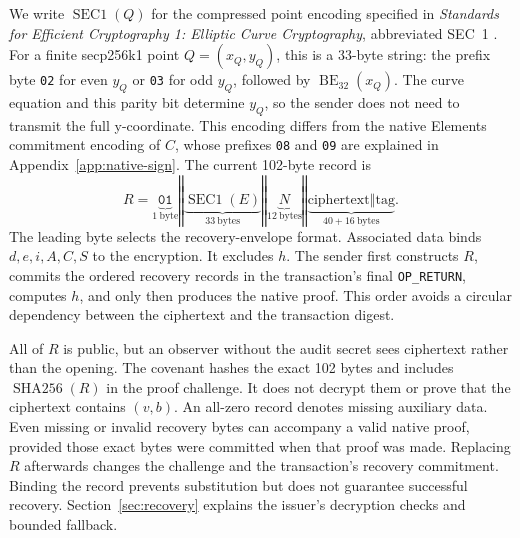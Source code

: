 \documentclass[11pt]{article}
\newcommand{\sha}{\operatorname{SHA256}}
\begin{document}
    We write $\operatorname{SEC1}(Q)$ for the compressed point encoding specified in \emph{Standards for Efficient Cryptography 1: Elliptic Curve Cryptography}, abbreviated SEC~1 \cite[Section~2.3.3]{sec1}.
    For a finite secp256k1 point $Q=(x_Q,y_Q)$, this is a 33-byte string: the prefix byte \texttt{02} for even $y_Q$ or \texttt{03} for odd $y_Q$, followed by $\operatorname{BE}_{32}(x_Q)$.
    The curve equation and this parity bit determine $y_Q$, so the sender does not need to transmit the full y-coordinate.
    This encoding differs from the native Elements commitment encoding of $C$, whose prefixes \texttt{08} and \texttt{09} are explained in Appendix~\ref{app:native-sign}.
    The current 102-byte record is
    \[
        R=\underbrace{\mathtt{01}}_{1\ \mathrm{byte}}
        \mathbin\Vert\underbrace{\operatorname{SEC1}(E)}_{33\ \mathrm{bytes}}
        \mathbin\Vert\underbrace{N}_{12\ \mathrm{bytes}}
        \mathbin\Vert\underbrace{\mathrm{ciphertext}\mathbin\Vert\mathrm{tag}}_{40+16\ \mathrm{bytes}}.
    \]
    The leading byte selects the recovery-envelope format.
    Associated data binds $d,e,i,A,C,S$ to the encryption.
    It excludes $h$.
    The sender first constructs $R$, commits the ordered recovery records in the transaction's final \texttt{OP\_RETURN}, computes $h$, and only then produces the native proof.
    This order avoids a circular dependency between the ciphertext and the transaction digest.

    All of $R$ is public, but an observer without the audit secret sees ciphertext rather than the opening.
    The covenant hashes the exact 102 bytes and includes $\sha(R)$ in the proof challenge.
    It does not decrypt them or prove that the ciphertext contains $(v,b)$.
    An all-zero record denotes missing auxiliary data.
    Even missing or invalid recovery bytes can accompany a valid native proof, provided those exact bytes were committed when that proof was made.
    Replacing $R$ afterwards changes the challenge and the transaction's recovery commitment.
    Binding the record prevents substitution but does not guarantee successful recovery.
    Section~\ref{sec:recovery} explains the issuer's decryption checks and bounded fallback.
\end{document}
